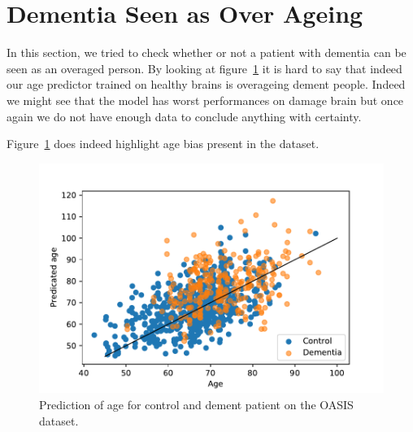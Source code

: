 \section{Dementia Seen as Over Ageing}
In this section, we tried to check whether or not a patient with dementia can be seen as an overaged person. By looking at figure~\ref{fig:dem_vs_control_age_pred} it is hard to say that indeed our age predictor trained on healthy brains is overageing dement people. Indeed we might see that the model has worst performances on damage brain but once again we do not have enough data to conclude anything with certainty. 

Figure~\ref{fig:dem_vs_control_age_pred} does indeed highlight age bias present in the dataset. 
\begin{figure}
 \centering
 \includegraphics[width=.9\linewidth]{figures/Experiements/dem_vs_cont_age_pred.pdf}
 \captionsetup{width=.9\linewidth}
 \caption{Prediction of age for control and dement patient on the OASIS dataset.}
 \label{fig:dem_vs_control_age_pred}
\end{figure}
